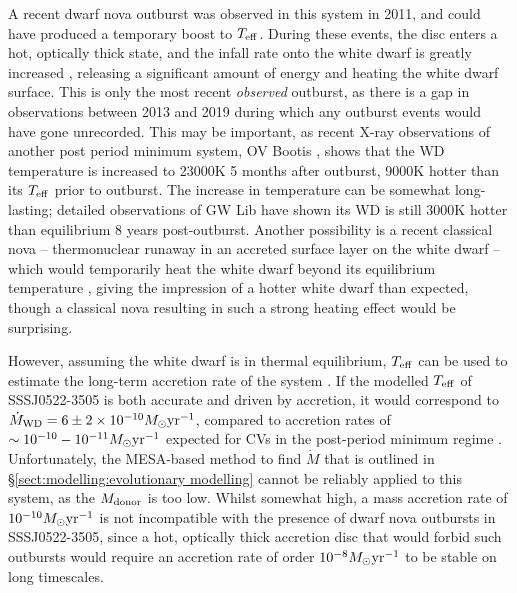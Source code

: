 A recent dwarf nova outburst was observed in this system in 2011, and could have produced a temporary boost to $T_{\rm eff}$. During these events, the disc enters a hot, optically thick state, and the infall rate onto the white dwarf is greatly increased \citep{osaki1996}, releasing a significant amount of energy and heating the white dwarf surface.
This is only the most recent \textit{observed} outburst, as there is a gap in observations between 2013 and 2019 during which any outburst events would have gone unrecorded. This may be important, as recent X-ray observations of another post period minimum system, OV Bootis \citep{Schwope2021}, shows that the WD temperature is increased to 23000K 5 months after outburst, 9000K hotter than its $T_{\rm eff}$ prior to outburst. The increase in temperature can be somewhat long-lasting; detailed observations of GW Lib have shown its WD is still 3000K hotter than equilibrium 8 years post-outburst\citep{Szkody2016}.
Another possibility is a recent classical nova -- thermonuclear runaway in an accreted surface layer on the white dwarf -- which would temporarily heat the white dwarf beyond its equilibrium temperature \citep{starrfield2016}, giving the impression of a hotter white dwarf than expected, though a classical nova resulting in such a strong heating effect would be surprising.

However, assuming the white dwarf is in thermal equilibrium, $T_{\rm eff}$ can be used to estimate the long-term accretion rate of the system \citep{townsley2009}.
If the modelled $T_{\rm eff}$ of SSSJ0522-3505 is both accurate and driven by accretion, it would correspond to $\dot M_{\rm WD} = 6\pm2 \times 10^{-10} M_\odot {\rm yr^{-1}}$, compared to accretion rates of $\sim10^{-10}-10^{-11} M_\odot {\rm yr^{-1}}$ expected for CVs in the post-period minimum regime \citep{Pala2017a}. Unfortunately, the MESA-based method to find $\dot M$ that is outlined in \S\ref{sect:modelling:evolutionary modelling} cannot be reliably applied to this system, as the $M_{\rm donor}$ is too low.
Whilst somewhat high, a mass accretion rate of $10^{-10} M_\odot {\rm yr^{-1}}$ is not incompatible with the presence of dwarf nova outbursts in SSSJ0522-3505, since a hot, optically thick accretion disc that would forbid such outbursts would require an accretion rate of order $10^{-8} M_\odot {\rm yr^{-1}}$ \citep{Hameury1998} to be stable on long timescales.
